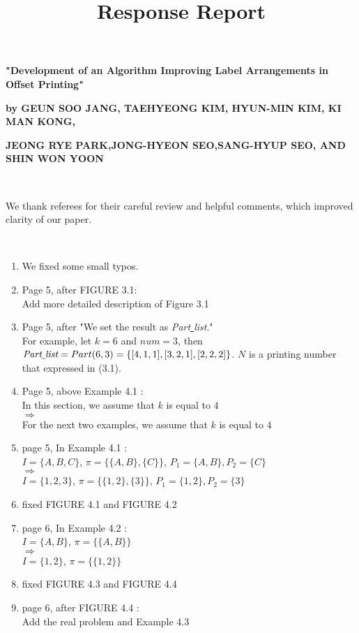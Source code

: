 \documentclass[10pt]{amsart}
\begin{document}
\title[Response Report]
{Response Report}
\maketitle
\centerline{\bf "Development of an Algorithm Improving Label Arrangements in Offset Printing"}
\centerline{\bf by GEUN SOO JANG, TAEHYEONG KIM, HYUN-MIN KIM, KI MAN KONG,}
\centerline{\bf  JEONG RYE PARK,JONG-HYEON SEO,SANG-HYUP SEO, AND SHIN WON YOON}

\

We thank referees for their careful review and helpful comments, which improved clarity of our paper.

\

\begin{enumerate}

\item We fixed some small typos.\\

\item Page 5, after FIGURE 3.1:\\
Add more detailed description of Figure 3.1\\

\item Page 5, after "We set the result as {\it Part\underline{ }list}."\\
For example, let $k=6$ and $num=3$, then $\text{\it Part\underline{ }list}={Part}(6, 3) = \{ [4,1,1],[3,2,1],[2,2,2] \}$.
$N$ is a printing number that expressed in (3.1).\\

\item Page 5, above Example 4.1 : \\
In this section, we assume that $k$ is equal to $4$\\
$\Longrightarrow$\\
For the next two examples, we assume that $k$ is equal to $4$\\

\item page 5, In Example 4.1 : \\
$I=\{A,B,C\}$,  $\pi = \{\{A,B\}, \{C\}\}$, $P_{1} = \{A,B\}, P_{2} = \{C\}$\\
$\Longrightarrow$\\
$I=\{1,2,3\}$,  $\pi = \{\{1,2\}, \{3\}\}$, $P_{1} = \{1,2\}, P_{2} = \{3\}$\\

\item fixed FIGURE 4.1 and FIGURE 4.2 \\


\item page 6, In Example 4.2 : \\
$I=\{A,B\}$,  $\pi = \{\{A,B\}\}$ \\
$\Longrightarrow$\\
$I=\{1,2\}$,  $\pi = \{\{1,2\}\}$ \\

\item fixed FIGURE 4.3 and FIGURE 4.4 \\

\item page 6, after FIGURE 4.4 :\\
Add the real problem and Example 4.3\\

\end{enumerate}
\end{document}
